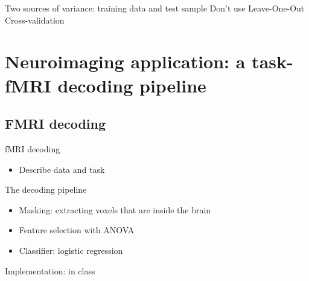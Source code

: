 \documentclass[presentation,mathserif,table]{beamer}
\begin{document}
\begin{frame}[label={sec:orgceec4b9}]{Two sources of variance: training data and test sample}
Don't use Leave-One-Out Cross-validation
\end{frame}
\section{Neuroimaging application: a task-fMRI decoding pipeline}
\label{sec:org4c84914}
\subsection{FMRI decoding}
\label{sec:org5a75420}
\begin{frame}[label={sec:org4d22a95}]{fMRI decoding}
\begin{itemize}
\item Describe data and task
\end{itemize}
\end{frame}
\begin{frame}[label={sec:org0dc23b5}]{The decoding pipeline}
\begin{itemize}
\item Masking: extracting voxels that are inside the brain
\item Feature selection with ANOVA
\item Classifier: logistic regression
\end{itemize}
\end{frame}
\begin{frame}[label={sec:org1a479fe}]{Implementation: in class}
\end{frame}
\end{document}
